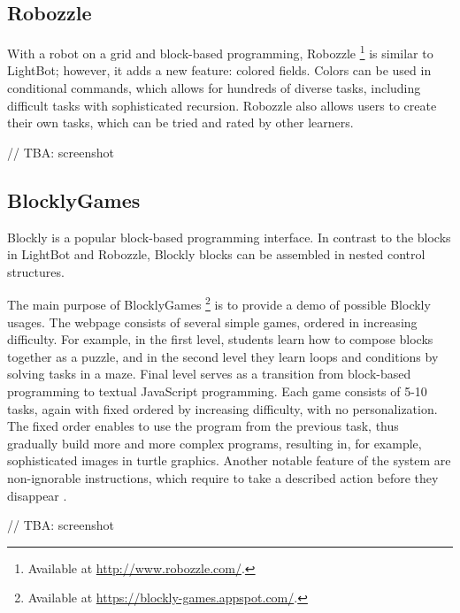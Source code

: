 \subsection{Robozzle}
\label{sec:robozzle}
With a robot on a grid and block-based programming, Robozzle%
  \footnote{Available at \url{http://www.robozzle.com/}.}
  is similar to LightBot;
however, it adds a new feature: colored fields.
Colors can be used in conditional commands,
  which allows for hundreds of diverse tasks,
  including difficult tasks with sophisticated recursion.
Robozzle also allows users to create their own tasks,
  which can be tried and rated by other learners.

// TBA: screenshot


\subsection{BlocklyGames}
\label{sec:blockly-games}
Blockly is a popular block-based programming interface.
In contrast to the blocks in LightBot and Robozzle,
Blockly blocks can be assembled in nested control structures.

The main purpose of BlocklyGames%
\footnote{Available at \url{https://blockly-games.appspot.com/}.}
is to provide a demo of possible Blockly usages.
The webpage consists of several simple games, ordered in increasing difficulty.
For example, in the first level, students learn how to compose blocks together as a puzzle,
and in the second level they learn loops and conditions by solving tasks in a maze.
Final level serves as a transition from block-based programming to textual JavaScript programming.
Each game consists of 5-10 tasks, again with fixed ordered by increasing difficulty, with no personalization.
The fixed order enables to use the program from the previous task,
thus gradually build more and more complex programs,
resulting in, for example, sophisticated images in turtle graphics.
Another notable feature of the system are non-ignorable instructions,
which require to take a described action before they disappear
\cite{blockly-10-things}.

// TBA: screenshot


